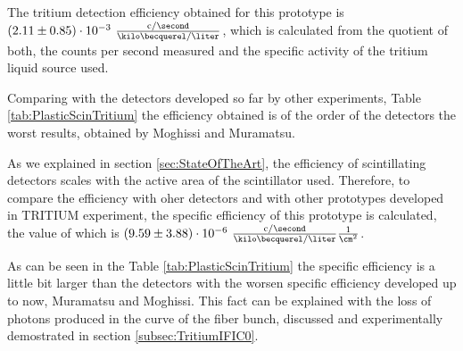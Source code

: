 The tritium detection efficiency obtained for this prototype is $(2.11 \pm 0.85)\cdot{} 10^{-3}~ \frac{\text{c}/\second}{\kilo\becquerel/\liter}$, which is calculated from the quotient of both, the counts per second measured and the specific activity of the tritium liquid source used.

Comparing with the detectors developed so far by other experiments, Table \ref{tab:PlasticScinTritium} the efficiency obtained is of the order of the detectors the worst results, obtained by Moghissi and Muramatsu. 

As we explained in section \ref{sec:StateOfTheArt}, the efficiency of scintillating detectors scales with the active area of the scintillator used. Therefore, to compare the efficiency with oher detectors and with other prototypes developed in TRITIUM experiment, the specific efficiency of this prototype is calculated, the value of which is $(9.59 \pm 3.88)\cdot{} 10^{-6}~ \frac{\text{c}/\second}{\kilo\becquerel/\liter}\frac{1}{\cm^{2}}$.

As can be seen in the Table \ref{tab:PlasticScinTritium} the specific efficiency is a little bit larger than the detectors with the worsen specific efficiency developed up to now, Muramatsu and Moghissi. This fact can be explained with the loss of photons produced in the curve of the fiber bunch, discussed and experimentally demostrated in section \ref{subsec:TritiumIFIC0}.


